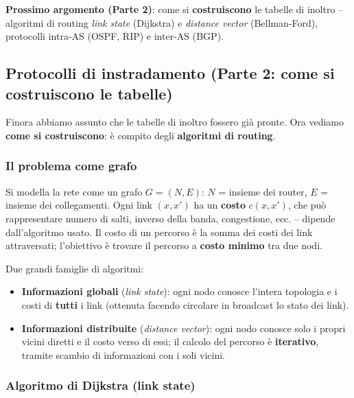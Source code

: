\documentclass[12pt, a4paper]{article}
\begin{document}
\textcolor{blue!70!black}{\textbf{Prossimo argomento (Parte 2)}}: come si \textbf{costruiscono} le tabelle di inoltro -- algoritmi di routing \textit{link state} (Dijkstra) e \textit{distance vector} (Bellman-Ford), protocolli intra-AS (OSPF, RIP) e inter-AS (BGP).


\subsection{Protocolli di instradamento (Parte 2: come si costruiscono le tabelle)}

Finora abbiamo assunto che le tabelle di inoltro fossero già pronte. Ora vediamo \textbf{come si costruiscono}: è compito degli \textbf{algoritmi di routing}.

\subsubsection{Il problema come grafo}

Si modella la rete come un grafo $G=(N,E)$: $N$ = insieme dei router, $E$ = insieme dei collegamenti. Ogni link $(x,x')$ ha un \textbf{costo} $c(x,x')$, che può rappresentare numero di salti, inverso della banda, congestione, ecc. -- dipende dall'algoritmo usato. Il costo di un percorso è la somma dei costi dei link attraversati; l'obiettivo è trovare il percorso a \textbf{costo minimo} tra due nodi.

Due grandi famiglie di algoritmi:
\begin{itemize}
    \item \textbf{Informazioni globali} (\textit{link state}): ogni nodo conosce l'intera topologia e i costi di \textbf{tutti} i link (ottenuta facendo circolare in broadcast lo stato dei link).
    \item \textbf{Informazioni distribuite} (\textit{distance vector}): ogni nodo conosce solo i propri vicini diretti e il costo verso di essi; il calcolo del percorso è \textbf{iterativo}, tramite scambio di informazioni con i soli vicini.
\end{itemize}

\subsubsection{Algoritmo di Dijkstra (link state)}
\end{document}
